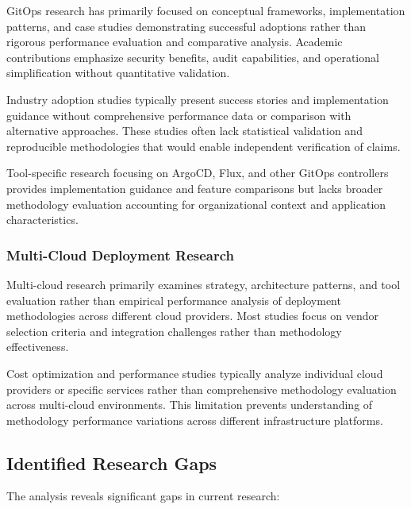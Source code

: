 GitOps research has primarily focused on conceptual frameworks, implementation patterns, and case studies demonstrating successful adoptions rather than rigorous performance evaluation and comparative analysis. Academic contributions emphasize security benefits, audit capabilities, and operational simplification without quantitative validation.

Industry adoption studies typically present success stories and implementation guidance without comprehensive performance data or comparison with alternative approaches. These studies often lack statistical validation and reproducible methodologies that would enable independent verification of claims.

Tool-specific research focusing on ArgoCD, Flux, and other GitOps controllers provides implementation guidance and feature comparisons but lacks broader methodology evaluation accounting for organizational context and application characteristics.

\subsubsection{Multi-Cloud Deployment Research}

Multi-cloud research primarily examines strategy, architecture patterns, and tool evaluation rather than empirical performance analysis of deployment methodologies across different cloud providers. Most studies focus on vendor selection criteria and integration challenges rather than methodology effectiveness.

Cost optimization and performance studies typically analyze individual cloud providers or specific services rather than comprehensive methodology evaluation across multi-cloud environments. This limitation prevents understanding of methodology performance variations across different infrastructure platforms.

\subsection{Identified Research Gaps}

The analysis reveals significant gaps in current research:

